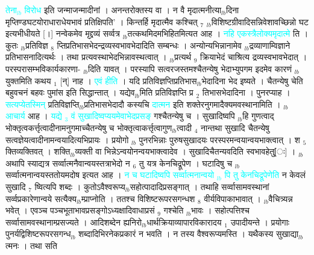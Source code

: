 \documentclass[article,12pt,a4paper]{memoir}%
\newcommand{\quotelemma}[1]{\textcolor{cyan}{#1}}
\begin{document}
\quotelemma{तेना{\tiny $_{lb}$}\leavevmode\ledsidenote{\textenglish{49/s}} विरोध} \cite[5a3]{vn-msN} इति जन्माजन्मादीनां । अनन्तरोक्तस्य वा । न वै मृदात्मनीत्या{\tiny $_{lb}$}दिना मृप्तिण्डघटयोराधाराधेयभावं प्रतिक्षिपति’ । किन्तर्हि मृदात्मैव कश्चित् {\tiny $_{7}$} {\tiny $_{lb}$}विशिष्टग्रीवादिसन्निवेशावच्छिन्नो घट इत्यभीधीयते [।] नन्वेकमेव मृद्द्रव्यं सर्व्वत्र {\tiny $_{lb}$}तत्कथमिदमभिहितमित्यत आह । \quotelemma{नहि एकस्त्रैलोक्यमृदात्मे} \cite[5a3]{vn-msN} ति । कुतः {\tiny $_{lb}$}प्रतिविज्ञ {\tiny $_{8}$} प्तिप्रतिभासभेदन्द्रव्यस्वभावभेदादिति सम्बन्धः । अन्योन्यभिन्नानामेव {\tiny $_{lb}$}द्रव्याणाम्विज्ञाने प्रतिभासनादित्यर्थः । तथा प्रत्यवस्थाभेदभिन्नावस्थत्वात् । {\tiny $_{lb}$}प्रत्यर्थ {\tiny $_{9}$} \leavevmode{} क्रियाभेदं चाश्रित्य द्रव्यस्वभावभेदात् । परस्परासम्भविकार्यकारणा- {\tiny $_{lb}$}दिति यावत् । परस्यापि सत्वरजस्तमश्चैतन्येषु भेदाभ्युपगम इदमेव कारणं {\tiny $_{lb}$}युक्तमिति कथय {\tiny $_{1}$} [न्] नाह । \quotelemma{एवं हीति} \cite[5a4]{vn-msN} । यदि प्रतिविज्ञप्तिप्रतिभास{\tiny $_{lb}$}भेदादिना भेद इष्यते । चैतन्येषु चेति बहुवचनं बहवः पुमांस इति सिद्धान्तात् । यद्येव{\tiny $_{lb}$}मिति प्रतिविज्ञप्ति प्र {\tiny $_{2}$} तिभासभेदादिना । पुनरप्याह । \quotelemma{सत्यप्येतस्मिन्} प्रतिविज्ञप्ति{\tiny $_{lb}$}प्रतिभासभेदादौ कस्यचि \quotelemma{दात्मन} \cite[5a4]{vn-msN} इति शक्तेरनुगमादैक्यमवस्थानामिति । {\tiny $_{lb}$} \quotelemma{आचार्य} आह । \quotelemma{यद्ये {\tiny $_{3}$} वं सुखादिष्वप्ययमेवाभेदप्रसङ्} गश्चैतन्येषु च । सुखादिष्वपि {\tiny $_{lb}$}हि गुणत्वाद् भोक्तृत्वकर्त्तृत्वादीनामनुगमाच्चैतन्येषु च भोक्तृत्वाकर्त्तृत्वागुण{\tiny $_{lb}$}त्वादी {\tiny $_{4}$} नान्तथा सुखादि चैतन्येषु सत्वज्ञेयत्वादीनामन्वयादित्यभिप्रायः । प्रयोगो {\tiny $_{lb}$} पुनरभिन्नाः पुरुषसुखादयः परस्परमन्वयान्वयभाक्त्वात् । श {\tiny $_{5}$} क्तिव्यक्तिवत् । शक्ति{\tiny $_{lb}$}व्यक्ती वा भिन्नेऽन्वयोनन्वयभाक्त्वादेव । सुखादिचैतन्यवदिति स्वभावहेतु[ः] । {\tiny $_{lb}$}अथापि स्याद्यत्र सर्व्वात्मनैवान्वयस्तत्राभेदो न {\tiny $_{6}$} तु यत्र केनचिद्रूपेण । घटादिषु च {\tiny $_{lb}$}सर्व्वात्मनान्वयस्ततोयमदोष इत्यत आह । \quotelemma{न च घटादिष्वपि सर्व्वात्मनान्वयो {\tiny $_{lb}$} \cite[5a5]{vn-msN} पि तु केनचिद्रूपेणेति} न केवलं सुखादि {\tiny $_{7}$} ष्वित्यपि शब्दः । कुतोऽवैश्वरूप्य{\tiny $_{lb}$}सहोत्पादादिप्रसङ्गात् । तथाहि सर्व्वासामवस्थानां सर्व्वप्रकारेणान्वये सत्यैक्य{\tiny $_{lb}$}म्प्राप्नोति । ततश्च विशिष्टरूपरसगन्धश {\tiny $_{8}$} वीर्यविपाकाभावात् । {\tiny $_{lb}$}वैचित्र्यन्न भवेत् । एवञ्च पञ्चभूताभावप्रसङ्गोऽध्यक्षादिवाधाप्रसं {\tiny $_{9}$} \leavevmode{} गश्चेति {\tiny $_{lb}$}भावः । सहोत्पत्तिश्च सर्व्वासामवस्थानाम्प्रसज्यते । आदिशब्देन ह्यनिरो{\tiny $_{lb}$}धार्थक्रियाव्यापारविकारादय {\tiny $_{1}$} उपादीयन्ते । प्रयोगाः पुनर्यद्विशिष्टरूपरसगन्ध{\tiny $_{lb}$} \leavevmode{} शब्दादिभिरनेकप्रकारं न भवति । न तस्य वैश्वरूप्यमस्ति । यथैकस्य सुखाद्या{\tiny $_{lb}$}त्मनः । तथा सति 
\end{document}
